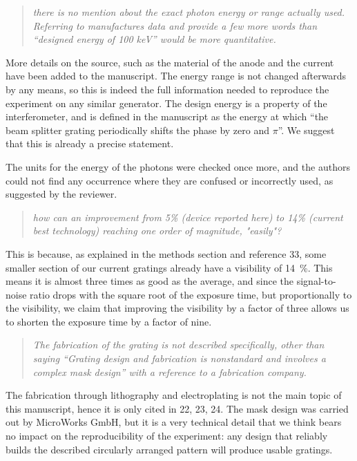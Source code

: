 \documentclass[a4paper,english]{scrartcl}
\newenvironment{reviewerquote}{\begin{quote}\itshape}{\end{quote}}
\begin{document}
\begin{reviewerquote}
there is no mention about the exact photon energy or range actually used.
Referring to manufactures data and provide a few more words than ``designed
energy of 100 keV'' would be more quantitative.
\end{reviewerquote}

More details on the source, such as the material of the anode and the
current have been added to the manuscript. The energy range is not changed
afterwards by any means, so this is indeed the full
information needed to reproduce the experiment on any similar generator.
The design energy is a property of the interferometer, and is defined in the
manuscript as the energy at which ``the beam splitter grating periodically
shifts the phase by zero and $\pi$''. We suggest that this is already a
precise statement.

The units for the energy of the
photons were checked once more, and the authors could not find any
occurrence where they are confused or incorrectly used, as suggested by the
reviewer.

\begin{reviewerquote}
    how can an improvement from 5\% (device reported here) to 14\% (current best technology) reaching one order of magnitude, "easily"?
\end{reviewerquote}

This is because, as explained in the methods section and reference 33, some smaller section
of our current gratings already have a visibility of \SI{14}{\percent}. This
means it is almost three times as good as the average, and since the
signal-to-noise ratio drops with the square root of the exposure time, but
proportionally to the visibility, we claim that improving the visibility by
a factor of three allows us to shorten the exposure time by a factor of
nine.

\begin{reviewerquote}
    The fabrication of the grating is not described specifically, other than
    saying ``Grating design and fabrication is nonstandard and involves a
    complex mask design'' with a reference to a fabrication company.
\end{reviewerquote}

The fabrication through lithography and electroplating is not the main topic
of this manuscript, hence it is only cited in 22, 23, 24. The mask design
was carried out by MicroWorks GmbH, but it is a very technical detail that
we think bears no impact on the reproducibility of the experiment: any
design that reliably builds the described circularly arranged pattern will
produce usable gratings.
\end{document}
